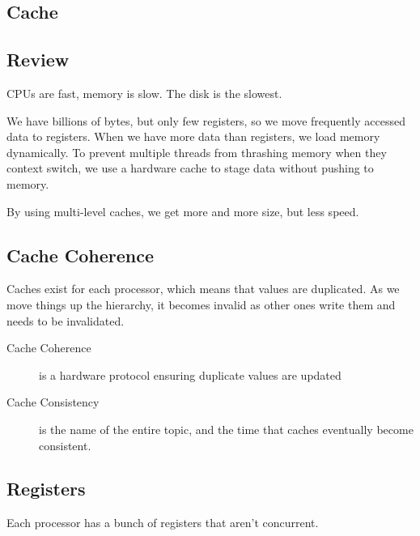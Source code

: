             \subsection{Cache} %
            \label{sub:cache}
                \subsection{Review} %
                \label{sub:review}
                    CPUs are fast, memory is slow.
                    The disk is the slowest.

                    We have billions of bytes, but only few registers, so we move frequently accessed data to registers.
                    When we have more data than registers, we load memory dynamically.
                    To prevent multiple threads from thrashing memory when they context switch, we use a hardware cache to stage data without pushing to memory.

                    By using multi-level caches, we get more and more size, but less speed.
                \subsection{Cache Coherence} %
                \label{sub:cache_coherence}
                    Caches exist for each processor, which means that values are duplicated.
                    As we move things up the hierarchy, it becomes invalid as other ones write them and needs to be invalidated.

                    \begin{description}
                        \item[Cache Coherence] is a hardware protocol ensuring duplicate values are updated
                        \item[Cache Consistency] is the name of the entire topic, and the time that caches eventually become consistent.
                    \end{description}

            \subsection{Registers} %
            \label{sub:registers}
                Each processor has a bunch of registers that aren't concurrent.

